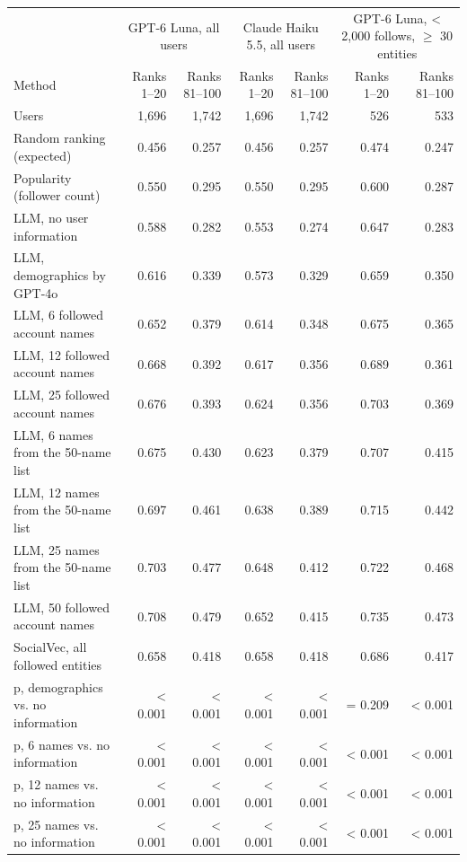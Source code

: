 \begin{tabular}{lrrrrrr}
\toprule
 & \multicolumn{2}{c}{GPT-6 Luna, all users} & \multicolumn{2}{c}{Claude Haiku 5.5, all users} & \multicolumn{2}{c}{GPT-6 Luna, \textless{} 2,000 follows, $\geq$ 30 entities} \\
Method & Ranks 1--20 & Ranks 81--100 & Ranks 1--20 & Ranks 81--100 & Ranks 1--20 & Ranks 81--100 \\
\midrule
Users & 1,696 & 1,742 & 1,696 & 1,742 & 526 & 533 \\
Random ranking (expected) & 0.456 & 0.257 & 0.456 & 0.257 & 0.474 & 0.247 \\
Popularity (follower count) & 0.550 & 0.295 & 0.550 & 0.295 & 0.600 & 0.287 \\
LLM, no user information & 0.588 & 0.282 & 0.553 & 0.274 & 0.647 & 0.283 \\
LLM, demographics by GPT-4o & 0.616 & 0.339 & 0.573 & 0.329 & 0.659 & 0.350 \\
LLM, 6 followed account names & 0.652 & 0.379 & 0.614 & 0.348 & 0.675 & 0.365 \\
LLM, 12 followed account names & 0.668 & 0.392 & 0.617 & 0.356 & 0.689 & 0.361 \\
LLM, 25 followed account names & 0.676 & 0.393 & 0.624 & 0.356 & 0.703 & 0.369 \\
LLM, 6 names from the 50-name list & 0.675 & 0.430 & 0.623 & 0.379 & 0.707 & 0.415 \\
LLM, 12 names from the 50-name list & 0.697 & 0.461 & 0.638 & 0.389 & 0.715 & 0.442 \\
LLM, 25 names from the 50-name list & 0.703 & 0.477 & 0.648 & 0.412 & 0.722 & 0.468 \\
LLM, 50 followed account names & 0.708 & 0.479 & 0.652 & 0.415 & 0.735 & 0.473 \\
SocialVec, all followed entities & 0.658 & 0.418 & 0.658 & 0.418 & 0.686 & 0.417 \\
p, demographics vs. no information & \textless{} 0.001 & \textless{} 0.001 & \textless{} 0.001 & \textless{} 0.001 & = 0.209 & \textless{} 0.001 \\
p, 6 names vs. no information & \textless{} 0.001 & \textless{} 0.001 & \textless{} 0.001 & \textless{} 0.001 & \textless{} 0.001 & \textless{} 0.001 \\
p, 12 names vs. no information & \textless{} 0.001 & \textless{} 0.001 & \textless{} 0.001 & \textless{} 0.001 & \textless{} 0.001 & \textless{} 0.001 \\
p, 25 names vs. no information & \textless{} 0.001 & \textless{} 0.001 & \textless{} 0.001 & \textless{} 0.001 & \textless{} 0.001 & \textless{} 0.001 \\

\end{tabular}
